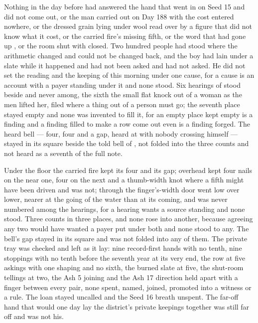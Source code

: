 Nothing in the day before had answered the hand that went in on Seed 15 and did not come out, or the man carried out on Day 188 with the cost entered nowhere, or the dressed grain lying under wool read over by a figure that did not know what it cost, or the carried fire's missing fifth, or the word that had gone up , or the room shut with  closed. Two hundred people had stood where the arithmetic changed and could not be changed back, and the boy had lain under a slate while it happened and had not been asked and had not asked. He did not set the reading and the keeping of this morning under one cause, for a cause is an account with a payer standing under it and none stood. Six hearings of  stood beside and never among, the sixth the small flat knock out of a woman as the men lifted her, filed where a thing out of a person must go; the seventh place stayed empty and none was invented to fill it, for an empty place kept empty is a finding and a finding filled to make a row come out even is a finding forged. The heard bell --- four, four and a gap, heard at  with nobody crossing himself --- stayed in its square beside the told bell of , not folded into the three counts and not heard as a seventh of the full note.

Under the floor the carried fire kept its four and its gap; overhead  kept four nails on the near one, four on the next and a thumb-width knot where a fifth might have been driven and was not; through the finger's-width door  went low over lower, nearer at the going of the water than at its coming, and was never numbered among the hearings, for a hearing wants a source standing and none stood. Three counts in three places, and none rose into another, because agreeing any two would have wanted a payer put under both and none stood to any. The bell's gap stayed in its square and was not folded into any of them. The private tray was checked and left as it lay: nine record-first hands with no tenth, nine stoppings with no tenth before the seventh year at its very end, the row at five askings with one shaping and no sixth, the burned slate at five, the shut-room tellings at two, the Ash 5 joining and the Ash 17 direction held apart with a finger between every pair, none spent, named, joined, promoted into a witness or a rule. The loan stayed uncalled and the Seed 16 breath unspent. The far-off hand that would one day lay the district's private keepings together was still far off and was not his.

